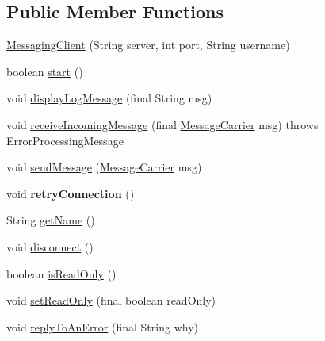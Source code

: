 \subsection*{Public Member Functions}
\begin{DoxyCompactItemize}
\item 
\hyperlink{classgov_1_1fnal_1_1ppd_1_1dd_1_1chat_1_1xml_1_1MessagingClient_aa68d42a1acaf6625cc4e7b351d066df5}{Messaging\-Client} (String server, int port, String username)
\item 
boolean \hyperlink{classgov_1_1fnal_1_1ppd_1_1dd_1_1chat_1_1xml_1_1MessagingClient_a7b5e1017daf1622ee78b5973aff6045e}{start} ()
\item 
void \hyperlink{classgov_1_1fnal_1_1ppd_1_1dd_1_1chat_1_1xml_1_1MessagingClient_a133d5bd20d4af888aa24e8ff1e8fe84c}{display\-Log\-Message} (final String msg)
\item 
void \hyperlink{classgov_1_1fnal_1_1ppd_1_1dd_1_1chat_1_1xml_1_1MessagingClient_ac14e7ceb5691c8455cdff48b018d2826}{receive\-Incoming\-Message} (final \hyperlink{classgov_1_1fnal_1_1ppd_1_1dd_1_1chat_1_1xml_1_1MessageCarrier}{Message\-Carrier} msg)  throws Error\-Processing\-Message 
\item 
void \hyperlink{classgov_1_1fnal_1_1ppd_1_1dd_1_1chat_1_1xml_1_1MessagingClient_a9df26a1230801cd41334510786a85ac9}{send\-Message} (\hyperlink{classgov_1_1fnal_1_1ppd_1_1dd_1_1chat_1_1xml_1_1MessageCarrier}{Message\-Carrier} msg)
\item 
\hypertarget{classgov_1_1fnal_1_1ppd_1_1dd_1_1chat_1_1xml_1_1MessagingClient_a1f967544000dc57761e735554382bb7a}{void {\bfseries retry\-Connection} ()}\label{classgov_1_1fnal_1_1ppd_1_1dd_1_1chat_1_1xml_1_1MessagingClient_a1f967544000dc57761e735554382bb7a}

\item 
String \hyperlink{classgov_1_1fnal_1_1ppd_1_1dd_1_1chat_1_1xml_1_1MessagingClient_af2ac78bbfcfc9e2e38e8188907a15ab4}{get\-Name} ()
\item 
void \hyperlink{classgov_1_1fnal_1_1ppd_1_1dd_1_1chat_1_1xml_1_1MessagingClient_a99afd003f9a7b88695ed65287a4d7772}{disconnect} ()
\item 
boolean \hyperlink{classgov_1_1fnal_1_1ppd_1_1dd_1_1chat_1_1xml_1_1MessagingClient_a68d329c16437d41b2293590356091182}{is\-Read\-Only} ()
\item 
void \hyperlink{classgov_1_1fnal_1_1ppd_1_1dd_1_1chat_1_1xml_1_1MessagingClient_a24bf96d3980ec7249e947771c5fb8ba8}{set\-Read\-Only} (final boolean read\-Only)
\item 
void \hyperlink{classgov_1_1fnal_1_1ppd_1_1dd_1_1chat_1_1xml_1_1MessagingClient_a084c55c0676908f4969f564bb3050e55}{reply\-To\-An\-Error} (final String why)
\end{DoxyCompactItemize}
